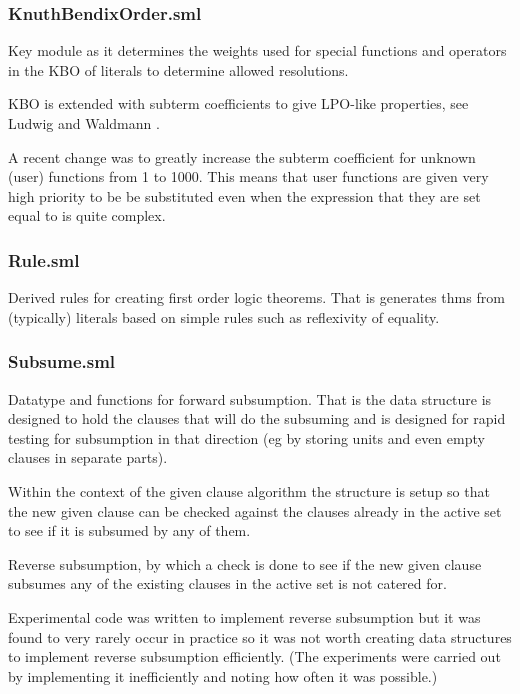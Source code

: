 \documentclass[11pt, oneside]{article}   	%
\begin{document}
\subsubsection{KnuthBendixOrder.sml}

Key module as it determines the weights used for special functions and operators in the KBO of literals to determine allowed resolutions.

KBO is extended with subterm coefficients to give LPO-like properties, see Ludwig and Waldmann \cite{KBO_ext}.

A recent change was to greatly increase the subterm coefficient for unknown (user) functions from 1 to 1000. This means that user functions are given
very high priority to be be substituted even when the expression that they are set equal to is quite complex.



\subsubsection{Rule.sml}
Derived rules for creating first order logic theorems. That is generates thms from (typically) literals based on simple rules such as reflexivity of equality.

\subsubsection{Subsume.sml}

Datatype and functions for forward subsumption. That is the data structure is designed to hold the clauses that will do the subsuming and is designed for rapid testing for
subsumption in that direction (eg by storing units and even empty clauses in separate parts).

Within the context of the given clause algorithm the structure is setup so that the new given clause can be checked against the clauses already in the active set to
see if it is subsumed by any of them.

Reverse subsumption, by which a check is done to see if the new given clause subsumes any of the existing clauses in the active set is not catered for.

Experimental code was written to implement reverse subsumption but it was found to very rarely occur in practice so it was not worth creating data structures to
implement reverse subsumption efficiently. (The experiments were carried out by implementing it inefficiently and noting how often it was possible.)
\end{document}
